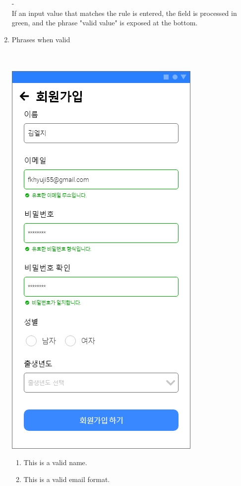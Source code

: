 \documentclass[conference]{IEEEtran}
\begin{document}
\begin{enumerate}
\begin{itemize}
\begin{enumerate}
\begin{enumerate}
        \end{enumerate}
    \item[-] \\ If an input value that matches the rule is entered, the field is processed in green, and the phrase "valid value" is exposed at the bottom. \\
    \item Phrases when valid \\ \\ \\
    \centerline{\includegraphics[scale=0.28]{assets/회원가입2.jpg}}
    \begin{enumerate}
\item This is a valid name.
\item This is a valid email format.

\end{enumerate}
\end{enumerate}
\end{itemize}
\end{enumerate}
\end{document}
